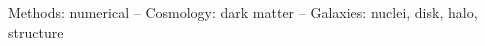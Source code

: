 \documentclass[preprint,5p,times,authoryear]{elsarticle}
\begin{document}


\begin{frontmatter}




\begin{keyword}
	Methods: numerical --
	Cosmology: dark matter --
	Galaxies: nuclei, disk, halo, structure
\end{keyword}

\end{frontmatter}




%




\end{document}
